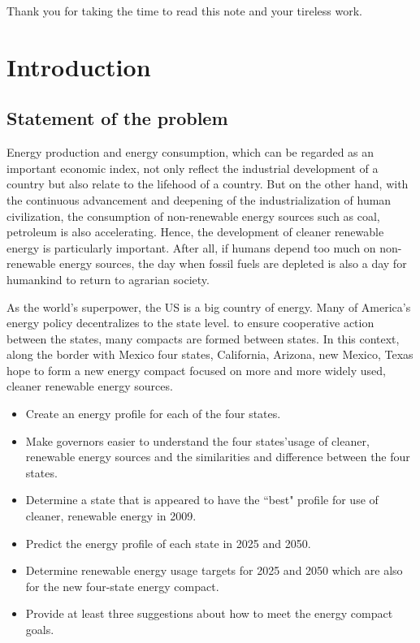 \documentclass{mcmthesis}
\begin{document}
Thank you for taking the time to read this note and your tireless work.
\newpage
\tableofcontents
\pagestyle{fancy} 
\rhead{\small\sffamily}
\newpage
{}
\setcounter{page}{1}

\section{Introduction}
\subsection{Statement of the problem}
Energy production and energy consumption, which can be regarded as an important economic index, not only reflect the industrial development of a country but also relate to the lifehood of a country. But on the other hand, with the continuous advancement and deepening of the industrialization of human civilization, the consumption of non-renewable energy sources such as coal, petroleum is also accelerating. Hence, the development of cleaner renewable energy is particularly important. After all, if humans depend too much on non-renewable energy sources, the day when fossil fuels are depleted is also a day for humankind to return to agrarian society.

As the world's superpower, the US is a big country of energy. Many of America's energy policy decentralizes to the state level. to ensure cooperative action between the states\cite{InterstateCompact}, many compacts are formed between states. In this context, along the border with Mexico four states, California, Arizona, new Mexico, Texas hope to form a new energy compact focused on more and more widely used, cleaner renewable energy sources.
\begin{itemize}
  \item Create an energy profile for each of the four states.
  \item Make governors easier to understand the four states'usage of cleaner, renewable energy sources  and the similarities and difference between the four states.
  \item Determine a state that is appeared to have the ``best" profile for use of cleaner, renewable energy in 2009.
  \item Predict the energy profile of each state in 2025 and 2050.
  \item Determine renewable energy usage targets for 2025 and 2050 which are also for the new four-state energy compact.
  \item Provide at least three suggestions about how to meet the energy compact goals.
\end{itemize}
\end{document}
